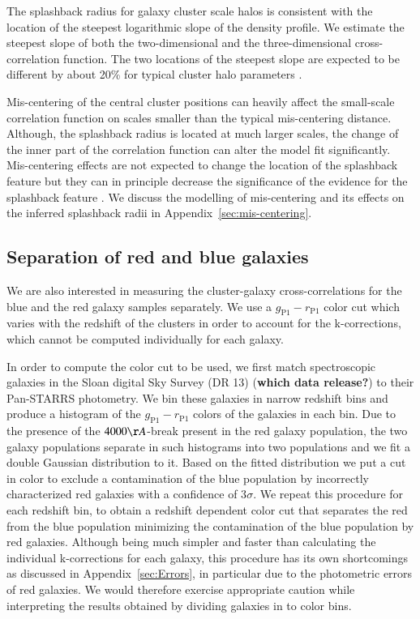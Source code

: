 \documentclass[iop, apjl, twocolappendix, numberedappendix]{emulateapj}
\begin{document}
The splashback radius for galaxy cluster scale halos is consistent
with the location of the steepest logarithmic slope of the density
profile. We estimate the steepest slope of both the two-dimensional
and the three-dimensional cross-correlation function. The two
locations of the steepest slope are expected to be different by
about 20\% for typical cluster halo parameters
\citep{diemer2014dependence, more2016detection}.

Mis-centering of the central cluster positions can heavily affect 
the small-scale correlation function on scales smaller than the typical mis-centering distance. 
Although, the splashback radius is located at much larger scales, 
the change of the inner part of the correlation function can alter the model fit significantly. 
Mis-centering effects are not expected to change the location of the splashback feature 
but they can in principle decrease the significance of the evidence for the splashback feature \citep{baxter2017halo}.
We discuss the modelling of mis-centering and its effects on the inferred splashback radii in Appendix~\ref{sec:mis-centering}.
\subsection{Separation of red and blue galaxies}
\label{sec:Color}

We are also interested in measuring the cluster-galaxy
cross-correlations for the blue and the red galaxy samples
separately. We use a $g_{\mathrm{P1}}-r_{\mathrm{P1}}$ color cut
which varies with the redshift of the clusters in order to account
for the k-corrections, which cannot be computed individually for
each galaxy.

In order to compute the color cut to be used, we first match spectroscopic
galaxies in the Sloan digital Sky Survey (DR 13) ({\bf which data release?}) to their
Pan-STARRS photometry. We bin these galaxies in narrow redshift bins and
produce a histogram of the $g_{\mathrm{P1}}-r_{\mathrm{P1}}$ colors of the
galaxies in each bin. Due to the presence of the $4000\AA$-break present in the
red galaxy population, the two galaxy populations separate in such histograms
into two populations and we fit a double Gaussian distribution to it.  Based on
the fitted distribution we put a cut in color to exclude a contamination of the
blue population by incorrectly characterized red galaxies with a confidence of
3$\sigma$. We repeat this procedure for each redshift bin, to obtain a redshift
dependent color cut that separates the red from the blue population minimizing
the contamination of the blue population by red galaxies. Although being much
simpler and faster than calculating the individual k-corrections for each
galaxy, this procedure has its own shortcomings as discussed in
Appendix~\ref{sec:Errors}, in particular due to the photometric errors of red
galaxies. We would therefore exercise appropriate caution while interpreting
the results obtained by dividing galaxies in to color bins.
\end{document}
